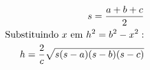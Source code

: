 \documentclass[preview]{standalone}
\begin{document}
\begin{align*}
\special{dvisvgm:raw <g id='unique000'>}s = \frac{a + b + c}{2}\\ \special{dvisvgm:raw </g>}\special{dvisvgm:raw <g id='unique001'>}\text{Substituindo } x \text{ em } h^2 = b^2 - x^2:\\ \special{dvisvgm:raw </g>}\special{dvisvgm:raw <g id='unique002'>}h = \frac{2}{c} \sqrt{s(s-a)(s-b)(s-c)}\special{dvisvgm:raw </g>}
\end{align*}
\end{document}
